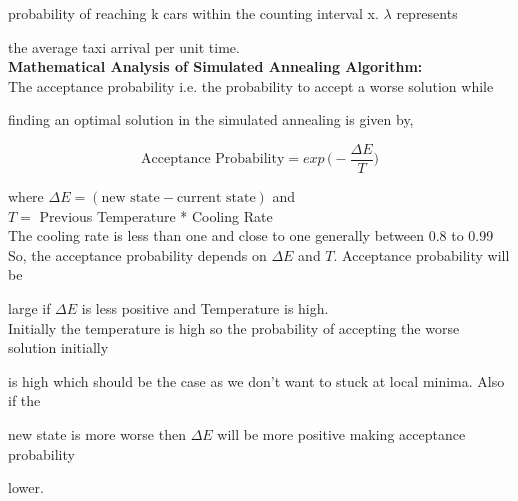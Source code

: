 \documentclass{article}
\begin{document}
probability of reaching k cars within the counting interval x. $\lambda$ represents 

the average taxi arrival per unit time. \\

\textbf{Mathematical Analysis of Simulated Annealing Algorithm: } \\

The acceptance probability i.e. the probability to accept a worse solution while

finding an optimal solution in the simulated annealing is given by,

\[\text{Acceptance Probability} = exp \, \Big(- \frac{\Delta E}{T} \Big)\]

where $\Delta E = (\text{new state} - \text{current state})$ and \\ 

\hspace{1.2cm} $T = $ Previous Temperature * Cooling Rate \\

The cooling rate is less than one and close to one generally between 0.8 to 0.99 \\

So, the acceptance probability depends on $\Delta E$ and $T$. Acceptance probability will be

large if $\Delta E$ is less positive and Temperature is high. \\

Initially the temperature is high so the probability of accepting the worse solution initially

is high which should be the case as we don't want to stuck at local minima. Also if the 

new state is more worse then $\Delta E$ will be more positive making acceptance probability

lower.

\newpage
\end{document}

